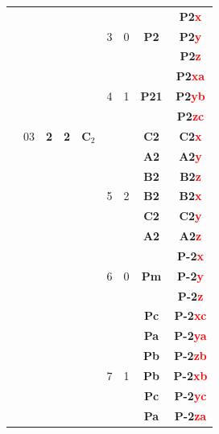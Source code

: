 \documentclass{article}      %
\begin{document}
\begin{small}
\begin{longtable}[c]{|c|c|c|c|c|c|c|c|c|}
 & & & & & & & &\textbf{P2\textcolor{red}{x}}  \\\cline{9-9}
 & & & & &\textrm{3} &0 &\textbf{P2}&\textbf{P2\textcolor{red}{y}} \\\cline{9-9}
 & & & & & & & &\textbf{P2\textcolor{red}{z}}  \\\cline{6-9}
 & & & & & & & &\textbf{P2\textcolor{red}{xa}}  \\\cline{9-9}
 & & & & &\textrm{4} &1 &\textbf{P21}&\textbf{P2\textcolor{red}{yb}} \\\cline{9-9}
 & & & & & & & &\textbf{P2\textcolor{red}{zc}}  \\\cline{6-9}
 & \textrm{03} &\textbf{2} &\textbf{2} &$\mathbf{C}_2$ & & &\textbf{C2}&\textbf{C2\textcolor{red}{x}} \\\cline{8-9}
 & & & & & & &\textbf{A2} &\textbf{A2\textcolor{red}{y}}  \\\cline{8-9}
 & & & & & & &\textbf{B2} &\textbf{B2\textcolor{red}{z}}  \\\cline{8-9}
 & & & & &\textrm{5} &2&\textbf{B2} &\textbf{B2\textcolor{red}{x}}  \\\cline{8-9}
 & & & & & & &\textbf{C2} &\textbf{C2\textcolor{red}{y}}  \\\cline{8-9}
 & & & & & & &\textbf{A2} &\textbf{A2\textcolor{red}{z}}  \\\cline{2-9}
 & & & & & & & &\textbf{P-2\textcolor{red}{x}}  \\\cline{9-9}
 & & & & &\textrm{6} &0 &\textbf{Pm}&\textbf{P-2\textcolor{red}{y}} \\\cline{9-9}
 & & & & & & & &\textbf{P-2\textcolor{red}{z}}  \\\cline{6-9}
 & & & & & & &\textbf{Pc} &\textbf{P-2\textcolor{red}{xc}}  \\\cline{8-9}
 & & & & & & &\textbf{Pa} &\textbf{P-2\textcolor{red}{ya}}  \\\cline{8-9}
 & & & & & & &\textbf{Pb} &\textbf{P-2\textcolor{red}{zb}}  \\\cline{8-9}
 & & & & &\textrm{7} &1&\textbf{Pb} &\textbf{P-2\textcolor{red}{xb}}  \\\cline{8-9}
 & & & & & & &\textbf{Pc} &\textbf{P-2\textcolor{red}{yc}}  \\\cline{8-9}
 & & & & & & &\textbf{Pa} &\textbf{P-2\textcolor{red}{za}}  \\\cline{8-9}

\end{longtable}
\end{small}
\end{document}
